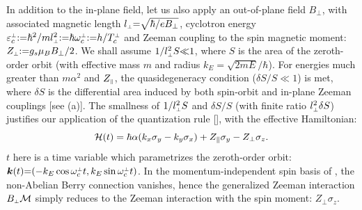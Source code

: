 \documentclass[aps, prb, showpacs, twocolumn, notitlepage, superscriptaddress]{revtex4-1}
\begin{document}
In addition to the in-plane field, let us also apply an out-of-plane field $B_{\perp}$, with associated magnetic length $l_{\scriptscriptstyle{\perp}}{=}\sqrt{\hbar/eB_{\perp}}$, cyclotron energy $\varepsilon^{\scriptscriptstyle{\perp}}_c{:}{=}\hbar^2/ml_{\scriptscriptstyle{\perp}}^2{:}{=}\hbar \omega_c^{\scriptscriptstyle{\perp}}{:}{=}h/T_c^{\scriptscriptstyle{\perp}}$ and Zeeman coupling to the spin magnetic moment:  $Z_{\scriptscriptstyle{\perp}}{:}{=}{g_s}\mu_B B_{\perp}/2$. We shall assume  $1/l_{\scriptscriptstyle{\perp}}^2S{\ll}1$, where $S$ is the area of the zeroth-order orbit (with effective mass $m$ and radius $k_E{=}\sqrt{2mE}/\hbar$). For energies much greater than $m\alpha^2$ and $Z_{\scriptscriptstyle{\parallel}}$, the quasidegeneracy condition ($\delta S/S{\ll}1$) is met, where $\delta S$ is the differential area induced by both spin-orbit and in-plane Zeeman couplings [see (a)].  The smallness of $1/l_{\scriptscriptstyle{\perp}}^2S$ and $\delta S/S$ (with finite ratio $l_{\scriptscriptstyle{\perp}}^2\delta S$) justifies our application of the quantization rule [],  with the effective Hamiltonian: 
\begin{equation}
{\cal H}(t)=\hbar\alpha(k_{x}\sigma_{y}-k_{y}\sigma_{x})+Z_\parallel\sigma_{y}-Z_\perp\sigma_{z}.\label{calHRZ}
\end{equation}
$t$ here is a time variable which parametrizes the zeroth-order orbit:
$\boldsymbol{k}(t){=}({-}k_E \cos \omega_c^{\scriptscriptstyle{\perp}} t, k_E \sin \omega_c^{\scriptscriptstyle{\perp}} t )$. In the momentum-independent spin basis of , the non-Abelian Berry connection vanishes, hence the generalized Zeeman interaction $B_{\scriptscriptstyle{\perp}}{\cal M}$ simply reduces to the Zeeman interaction with the spin  moment: $Z_\perp\sigma_{z}$.
\end{document}
